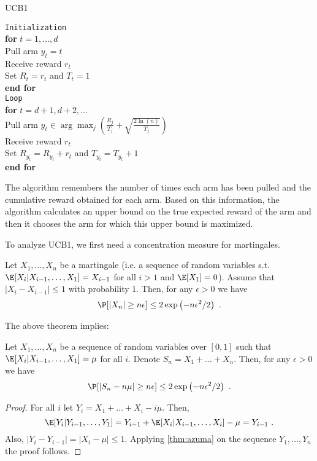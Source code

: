 \begin{algorithm}
  \caption{UCB1}\label{alg:UCB1}
  \texttt{Initialization}  \\
   \textbf{for} $t=1,\ldots,d$  \\
     Pull arm $y_t = t$ \\
     Receive reward $r_t$ \\
     Set $R_t = r_t$ and $T_t = 1$  \\
   \textbf{end for}  \\
 \texttt{Loop}  \\
   \textbf{for} $t=d+1,d+2,\ldots$  \\
     Pull arm $y_t \in \arg\max_j \left(\tfrac{R_j}{T_j} + \sqrt{\tfrac{2
         \ln(n)}{T_j}}\right)$ \\
     Receive reward $r_t$ \\
     Set $R_{y_t} = R_{y_t}+r_t$ and $T_{y_t} = T_{y_t} + 1$  \\
  \textbf{end for}
\end{algorithm}

The algorithm remembers the number of times each arm has been pulled
and the cumulative reward obtained for each arm. Based on this
information, the algorithm calculates an upper bound on the true
expected reward of the arm and then it chooses the arm for which this upper
bound is maximized.

To analyze UCB1, we first need a concentration measure for martingales.

\begin{theorem}[Azuma] \label{thm:azuma}
  Let $X_1,\ldots,X_n$ be a martingale (i.e. a sequence of random
  variables s.t. $\E[X_i|X_{i-1},\ldots,X_1] = X_{i-1}$ for all $i>1$ and
  $\E[X_1]=0$). Assume that $|X_i-X_{i-1}| \le 1$ with probability
  $1$. Then, for any $\epsilon > 0$ we have
\[
\P[ |X_n | \ge n\epsilon] \le 2\exp\left( - n\epsilon^2/2\right) ~.
\]
\end{theorem}

The above theorem implies:
\begin{lemma} \label{lem:azuma2}
Let $X_1,\ldots,X_n$ be a sequence of random variables over $[0,1]$
such that $\E[X_i|X_{i-1},\ldots,X_1]= \mu$ for all $i$.
Denote $S_n = X_1+\ldots+X_n$. Then, for any $\epsilon > 0$ we have
\[
\P[|S_n - n\mu| \ge n\epsilon] \le 2\exp\left( - n\epsilon^2/2\right) ~.
\]
\end{lemma}
\begin{proof}
For all $i$ let $Y_i = X_1+\ldots+X_i - i\mu$. Then,
\[
\E[Y_i | Y_{i-1},\ldots,Y_1] = Y_{i-1} + \E[X_i|X_{i-1},\ldots,X_i] -
\mu = Y_{i-1} ~.
\]
Also, $|Y_i - Y_{i-1}| = |X_i - \mu| \le 1$.
Applying \ref{thm:azuma} on the sequence $Y_1,\ldots,Y_n$ the proof
follows.
\end{proof}

